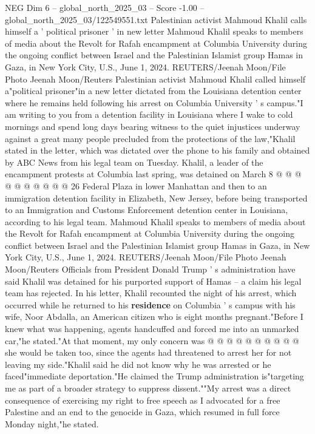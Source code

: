 \begin{textsample}{NEG Dim 6 – global\_north\_2025\_03 – Score -1.00 – global\_north\_2025\_03/122549551.txt}  \label{ex:f6_neg_235}
Palestinian activist Mahmoud Khalil calls himself a ' political prisoner ' in new letter Mahmoud Khalil speaks to members of media about the Revolt for Rafah encampment at Columbia University during the ongoing conflict between Israel and the Palestinian Islamist group Hamas in Gaza, in New York City, U.S., June 1, 2024.
REUTERS/Jeenah Moon/File Photo Jeenah Moon/Reuters Palestinian activist Mahmoud Khalil called himself a"political prisoner"in a new letter dictated from the Louisiana detention center where he remains held following his arrest on Columbia University ' s campus."I am writing to you from a detention facility in Louisiana where I wake to cold mornings and spend long days bearing witness to the quiet injustices underway against a great many people precluded from the protections of the law,"Khalil stated in the letter, which was dictated over the phone to his family and obtained by ABC News from his legal team on Tuesday.
Khalil, a leader of the encampment protests at Columbia last spring, was detained on March 8 @ @ @ @ @ @ @ @ @ @ 26 Federal Plaza in lower Manhattan and then to an immigration detention facility in Elizabeth, New Jersey, before being transported to an Immigration and Customs Enforcement detention center in Louisiana, according to his legal team.
Mahmoud Khalil speaks to members of media about the Revolt for Rafah encampment at Columbia University during the ongoing conflict between Israel and the Palestinian Islamist group Hamas in Gaza, in New York City, U.S., June 1, 2024.
REUTERS/Jeenah Moon/File Photo Jeenah Moon/Reuters Officials from President Donald Trump ' s administration have said Khalil was detained for his purported support of Hamas -- a claim his legal team has rejected.
In his letter, Khalil recounted the night of his arrest, which occurred while he returned to his \textbf{residence} on Columbia ' s campus with his wife, Noor Abdalla, an American citizen who is eight months pregnant."Before I knew what was happening, agents handcuffed and forced me into an unmarked car,"he stated."At that moment, my only concern was @ @ @ @ @ @ @ @ @ @ she would be taken too, since the agents had threatened to arrest her for not leaving my side."Khalil said he did not know why he was arrested or he faced"immediate deportation."He claimed the Trump administration is"targeting me as part of a broader strategy to suppress dissent.""My arrest was a direct consequence of exercising my right to free speech as I advocated for a free Palestine and an end to the genocide in Gaza, which resumed in full force Monday night,"he stated.

\end{textsample}
